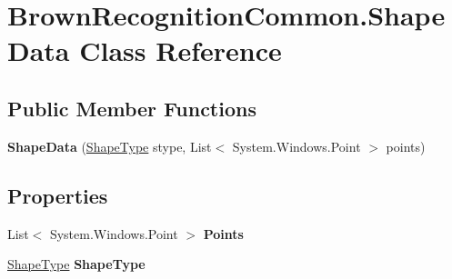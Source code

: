 \hypertarget{class_brown_recognition_common_1_1_shape_data}{
\section{\-Brown\-Recognition\-Common.\-Shape\-Data \-Class \-Reference}
\label{class_brown_recognition_common_1_1_shape_data}
}
\subsection*{\-Public \-Member \-Functions}
\begin{DoxyCompactItemize}
\item 
\hypertarget{class_brown_recognition_common_1_1_shape_data_a4f22750ca1551e86de81e12b630cd6cc}{
{\bfseries \-Shape\-Data} (\hyperlink{namespace_brown_recognition_common_a86340ddb3d90188573ed7b4484046ec3}{\-Shape\-Type} stype, \-List$<$ \-System.\-Windows.\-Point $>$ points)}
\label{class_brown_recognition_common_1_1_shape_data_a4f22750ca1551e86de81e12b630cd6cc}

\end{DoxyCompactItemize}
\subsection*{\-Properties}
\begin{DoxyCompactItemize}
\item 
\hypertarget{class_brown_recognition_common_1_1_shape_data_a801a7ddb55c0ebb41d8af5f2585533f1}{
\-List$<$ \-System.\-Windows.\-Point $>$ {\bfseries \-Points}}
\label{class_brown_recognition_common_1_1_shape_data_a801a7ddb55c0ebb41d8af5f2585533f1}

\item 
\hypertarget{class_brown_recognition_common_1_1_shape_data_a9eed8f97af60e98316764c68142fa835}{
\hyperlink{namespace_brown_recognition_common_a86340ddb3d90188573ed7b4484046ec3}{\-Shape\-Type} {\bfseries \-Shape\-Type}}
\label{class_brown_recognition_common_1_1_shape_data_a9eed8f97af60e98316764c68142fa835}

\end{DoxyCompactItemize}
